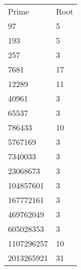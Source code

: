 \normalsize
\begin{tabular}{ l l }
Prime & Root \\
97 & 5 \\
193 & 5 \\
257 & 3 \\
7681 & 17 \\
12289 & 11 \\
40961 & 3 \\
65537 & 3 \\
786433 & 10 \\
5767169 & 3 \\
7340033 & 3 \\
23068673 & 3 \\
104857601 & 3 \\
167772161 & 3 \\
469762049 & 3 \\
605028353 & 3 \\
1107296257 & 10 \\
2013265921 & 31
\end{tabular}
